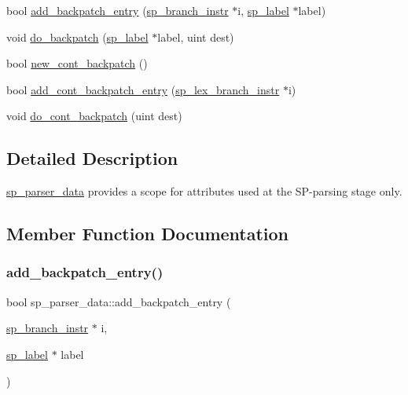 \begin{DoxyCompactItemize}
bool \mbox{\hyperlink{classsp__parser__data_a24e19c38db70699bffb8147e1f1d4178}{add\+\_\+backpatch\+\_\+entry}} (\mbox{\hyperlink{classsp__branch__instr}{sp\+\_\+branch\+\_\+instr}} $\ast$i, \mbox{\hyperlink{classsp__label}{sp\+\_\+label}} $\ast$label)
\item 
void \mbox{\hyperlink{classsp__parser__data_afef12cbb1f7562091238e01a492f9201}{do\+\_\+backpatch}} (\mbox{\hyperlink{classsp__label}{sp\+\_\+label}} $\ast$label, uint dest)
\item 
bool \mbox{\hyperlink{classsp__parser__data_af658fd5aa0ce26b21268b34be0fd2c29}{new\+\_\+cont\+\_\+backpatch}} ()
\item 
bool \mbox{\hyperlink{classsp__parser__data_abfbd10313fd6eb4fc52276afd8e9dc24}{add\+\_\+cont\+\_\+backpatch\+\_\+entry}} (\mbox{\hyperlink{classsp__lex__branch__instr}{sp\+\_\+lex\+\_\+branch\+\_\+instr}} $\ast$i)
\item 
void \mbox{\hyperlink{classsp__parser__data_a5c7d82d576eae213a1613809a47910d5}{do\+\_\+cont\+\_\+backpatch}} (uint dest)
\end{DoxyCompactItemize}


\subsection{Detailed Description}
\mbox{\hyperlink{classsp__parser__data}{sp\+\_\+parser\+\_\+data}} provides a scope for attributes used at the SP-\/parsing stage only. 

\subsection{Member Function Documentation}
\mbox{\label{classsp__parser__data_a24e19c38db70699bffb8147e1f1d4178}} 
\subsubsection{\texorpdfstring{add\+\_\+backpatch\+\_\+entry()}{add\_backpatch\_entry()}}
{\footnotesize\ttfamily bool sp\+\_\+parser\+\_\+data\+::add\+\_\+backpatch\+\_\+entry (\begin{DoxyParamCaption}\item[{\mbox{\hyperlink{classsp__branch__instr}{sp\+\_\+branch\+\_\+instr}} $\ast$}]{i,  }\item[{\mbox{\hyperlink{classsp__label}{sp\+\_\+label}} $\ast$}]{label }\end{DoxyParamCaption})}

